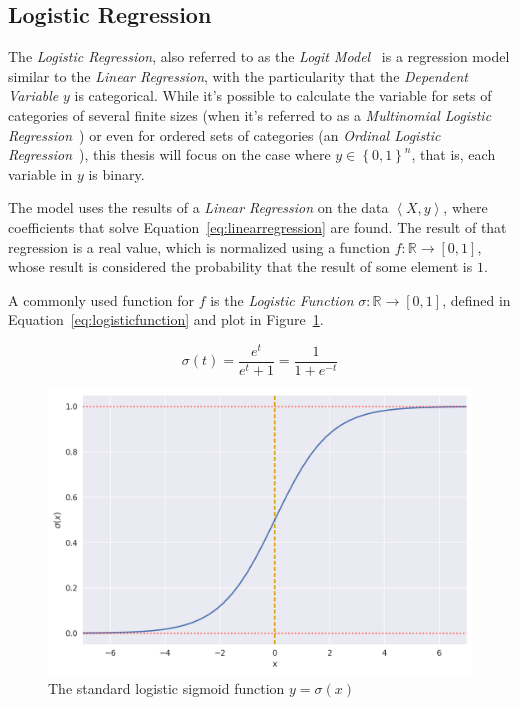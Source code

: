 \subsection{Logistic Regression}
\label{subsec:logisticregression}

The \emph{Logistic Regression}, also referred to as the \emph{Logit Model}~\cite{freedman2009statistical} is a regression model similar to the \emph{Linear Regression}, with the particularity that the \emph{Dependent Variable} $y$ is categorical. While it's possible to calculate the variable for sets of categories of several finite sizes (when it's referred to as a \emph{Multinomial Logistic Regression}~\cite{greene_econometric_2011}) or even for ordered sets of categories (an \emph{Ordinal Logistic Regression}~\cite{mccullagh1980ordinal}), this thesis will focus on the case where $y \in {\left\{ 0, 1 \right\}}^n$, that is, each variable in $y$ is binary.

The model uses the results of a \emph{Linear Regression} on the data $\left< X, y \right>$, where coefficients that solve Equation~\ref{eq:linearregression} are found. The result of that regression is a real value, which is normalized using a function $f : \mathbb{R} \rightarrow \left[ 0, 1 \right]$, whose result is considered the probability that the result of some element is $1$.

A commonly used function for $f$ is the \emph{Logistic Function} $\sigma : \mathbb{R} \rightarrow \left[ 0, 1 \right]$, defined in Equation~\ref{eq:logisticfunction} and plot in Figure~\ref{fig:sigmoid}.

\begin{equation}
\label{eq:logisticfunction}
\sigma \left( t \right) = \frac{e^t}{e^t + 1} = \frac{1}{1 + e^{-t}}
\end{equation}

\begin{figure}
\centering
\includegraphics[width=.75\textwidth]{figures/sigmoid.png}
\caption{The standard logistic sigmoid function $y = \sigma(x)$}
\label{fig:sigmoid}
\end{figure}

